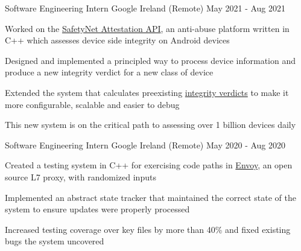 \begin{cventries}
  \cventry
    {Software Engineering Intern}
    {Google}
    {Ireland (Remote)}
    {May 2021 - Aug 2021}
    {
      \begin{cvitems}
      \item Worked on the \href{https://developer.android.com/training/safetynet/attestation}{SafetyNet Attestation API}, an anti-abuse platform written in C++ which assesses device side integrity on Android devices
        \item Designed and implemented a principled way to process device information and produce a new integrity verdict for a new class of device
        \item Extended the system that calculates preexisting \href{https://developer.android.com/training/safetynet/attestation\#potential-integrity-verdicts}{integrity verdicts} to make it more configurable, scalable and easier to debug
        \item This new system is on the critical path to assessing over 1 billion devices daily
      \end{cvitems}
    }

  \cventry
    {Software Engineering Intern}
    {Google}
    {Ireland (Remote)}
    {May 2020 - Aug 2020}
    {
      \begin{cvitems}
        \item Created a testing system in C++ for exercising code paths in \href{https://github.com/envoyproxy/envoy}{Envoy}, an open source L7 proxy, with randomized inputs
        \item Implemented an abstract state tracker that maintained the correct state of the system to ensure updates were properly processed
        \item Increased testing coverage over key files by more than 40\% and fixed existing bugs the system uncovered
      \end{cvitems}
    }

\end{cventries}
